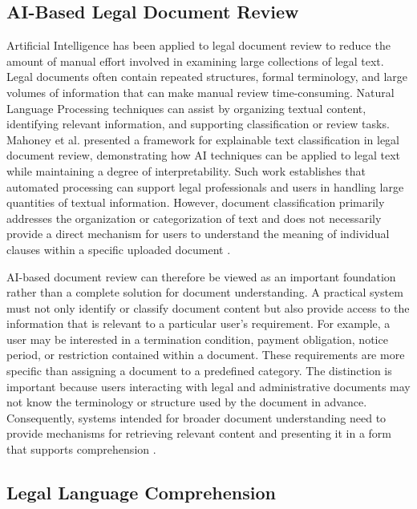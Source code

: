 \documentclass[12pt,a4paper,oneside]{report}
\begin{document}
\subsection{AI-Based Legal Document Review}

Artificial Intelligence has been applied to legal document review to reduce
the amount of manual effort involved in examining large collections of legal
text. Legal documents often contain repeated structures, formal terminology,
and large volumes of information that can make manual review time-consuming.
Natural Language Processing techniques can assist by organizing textual
content, identifying relevant information, and supporting classification or
review tasks. Mahoney et al. presented a framework for explainable text
classification in legal document review, demonstrating how AI techniques can
be applied to legal text while maintaining a degree of interpretability. Such
work establishes that automated processing can support legal professionals and
users in handling large quantities of textual information. However, document
classification primarily addresses the organization or categorization of text
and does not necessarily provide a direct mechanism for users to understand
the meaning of individual clauses within a specific uploaded document
\cite{mahoney2019}.

AI-based document review can therefore be viewed as an important foundation
rather than a complete solution for document understanding. A practical system
must not only identify or classify document content but also provide access to
the information that is relevant to a particular user's requirement. For
example, a user may be interested in a termination condition, payment
obligation, notice period, or restriction contained within a document. These
requirements are more specific than assigning a document to a predefined
category. The distinction is important because users interacting with legal
and administrative documents may not know the terminology or structure used
by the document in advance. Consequently, systems intended for broader
document understanding need to provide mechanisms for retrieving relevant
content and presenting it in a form that supports comprehension
\cite{mahoney2019,nethriya2024}.

\subsection{Legal Language Comprehension}
\end{document}
